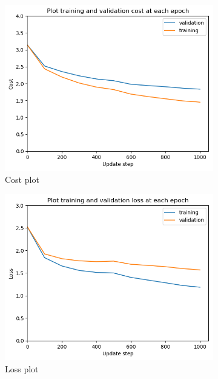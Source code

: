 \documentclass[12pt]{article}
\newenvironment{question}[2][Question]{\begin{trivlist}
\kern10pt
\item[\hskip \labelsep {\bfseries #1}\hskip \labelsep {\bfseries #2.}]}{\end{trivlist}}
\begin{document}
\begin{question}{ii}
\begin{figure}[!htb]
    \begin{subfigure}[b]{0.32\textwidth}
        \includegraphics[width=\linewidth]{f3_cost_plt.png}
        \caption{Cost plot}
    \end{subfigure}
    \hfill
    \begin{subfigure}[b]{0.32\textwidth}
        \includegraphics[width=\linewidth]{f3_loss_plt.png}
        \caption{Loss plot}
    \end{subfigure}\hfill
    \begin{subfigure}[b]{0.32\textwidth}%

\end{subfigure}
\end{figure}
\end{question}
\end{document}
